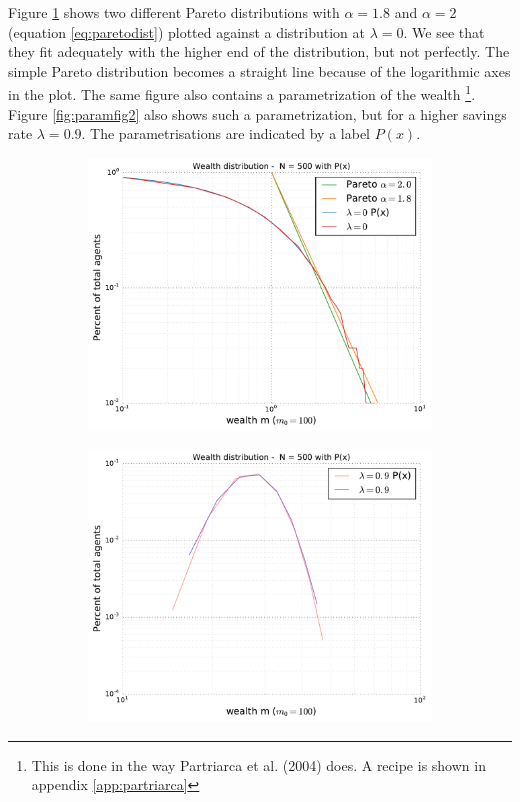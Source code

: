 \documentclass[10pt, a4paper]{amsart}
\begin{document}
Figure \ref{fig:paramfig1} shows two different Pareto distributions with $\alpha=1.8$ and $\alpha = 2$ (equation \ref{eq:paretodist}) plotted against a distribution at $\lambda = 0$. We see that they fit adequately with the higher end of the distribution, but not perfectly. The simple Pareto distribution becomes a straight line because of the logarithmic axes in the plot. The same figure also contains a parametrization of the wealth \footnote{This is done in the way Partriarca et al. (2004)\cite{Patriarca} does. A recipe is shown in appendix \ref{app:partriarca}}. Figure \ref{fig:paramfig2} also shows such a parametrization, but for a higher savings rate $\lambda=0.9$. The parametrisations are indicated by a label $P(x)$.

\begin{figure}
\begin{subfigure}{.5\textwidth}
  \centering
  \includegraphics[width=\linewidth]{../figures/5ac/5c_parameterization0.pdf}
  \caption{}
  \label{fig:paramfig1}
\end{subfigure}%
\begin{subfigure}{.5\textwidth}
  \centering
  \includegraphics[width=\linewidth]{../figures/5ac/5c_parameterization09.pdf}

\end{subfigure}
\end{figure}
\end{document}
